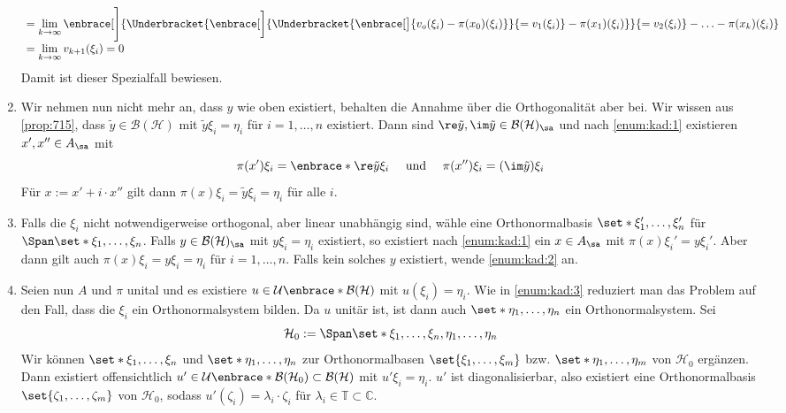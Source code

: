 \begin{beweis}
\begin{enumerate}[label={Teil \Roman*.},wide,font=\bfseries\scshape,itemsep=2pt]
\begin{align}
			&= \lim_{k \to \infty} \enbrace[\Bigg]{\Underbracket{\enbrace[\bigg]{ \Underbracket{\enbrace[\big]{v_o(\xi_i) - \pi(x_0)(\xi_i)}}{=v_1(\xi_i)} - \pi(x_1)(\xi_i)}}{=v_2(\xi_i)} - \ldots - \pi(x_k)(\xi_i)} \\[-3pt]
			&= \lim_{k  \to \infty} v_{k+1}(\xi_i) =0
		\end{align}
		Damit ist dieser Spezialfall bewiesen.
		\item \label{enum:kad:2} Wir nehmen nun nicht mehr an, dass $y$ wie oben existiert, behalten die Annahme über die Orthogonalität aber bei.
		Wir wissen aus \autoref{prop:715}, dass $\tilde{y} \in \mathcal{B}(\mathcal{H})$ mit $\tilde{y} \xi_i = \eta_i$ für $i=1,\ldots ,n$ existiert.
		Dann sind $\re \tilde{y}, \im \tilde{y} \in \mathcal{B}(\mathcal{H})_\sa$ und nach \ref{enum:kad:1} existieren $x',x'' \in A_\sa$ mit 
		\[
			\pi(x') \xi_i = \enbrace*{\re \tilde{y}} \xi_i \quad \text{ und } \quad \pi(x'') \xi_i = (\im \tilde{y})\xi_i 
		\]
		Für $x := x' + i \cdot x''$ gilt dann $\pi(x) \xi_i = \tilde{y}\xi_i = \eta_i$ für alle $i$.
		\item \label{enum:kad:3}Falls die $\xi_i$ nicht notwendigerweise orthogonal, aber linear unabhängig sind, wähle eine Orthonormalbasis $\set*{\xi_1', \ldots , \xi_n'}$ für $\Span \set*{\xi_1, \ldots ,\xi_n}$.
		Falls $y \in \mathcal{B}(\mathcal{H})_\sa$ mit $y \xi_i = \eta_i$ existiert, so existiert nach \ref{enum:kad:1} ein $x \in A_\sa$ mit $\pi(x)\xi_i' = y \xi_i'$.
		Aber dann gilt auch $\pi(x)\xi_i = y \xi_i = \eta_i$ für $i=1,\ldots ,n$.
		Falls kein solches $y$ existiert, wende \ref{enum:kad:2} an.
		\item \label{enum:kad:4} Seien nun $A$ und $\pi$ unital und es existiere $u \in \mathcal{U}\enbrace*{\mathcal{B}(\mathcal{H})}$ mit $u(\xi_i)=\eta_i$.
		Wie in \ref{enum:kad:3} reduziert man das Problem auf den Fall, dass die $\xi_i$ ein Orthonormalsystem bilden.
		Da $u$ unitär ist, ist dann auch $\set*{\eta_1,\ldots ,\eta_n}$ ein Orthonormalsystem.
		Sei 
		\[
			\mathcal{H}_0 := \Span \set*{\xi_1, \ldots, \xi_n, \eta_1, \ldots ,\eta_n}
		\]
		Wir können $\set*{\xi_1, \ldots ,\xi_n}$ und $\set*{\eta_1,\ldots ,\eta_n}$ zur Orthonormalbasen $\set{\xi_1, \ldots ,\xi_m}$ bzw. $\set*{\eta_1, \ldots ,\eta_m}$ von $\mathcal{H}_0$ ergänzen.
		Dann existiert offensichtlich $u' \in \mathcal{U}\enbrace*{\mathcal{B}(\mathcal{H}_0)} \subset \mathcal{B}(\mathcal{H})$ mit $u' \xi_i = \eta_i$.
		$u'$ ist diagonalisierbar, also existiert eine Orthonormalbasis $\set{\zeta_1,\ldots , \zeta_m}$ von $\mathcal{H}_0$, sodass $u'(\zeta_i) = \lambda_i \cdot \zeta_i$ für $\lambda_i \in \mathbb{T} \subset \mathbb{C}$. 

\end{enumerate}
\end{beweis}
